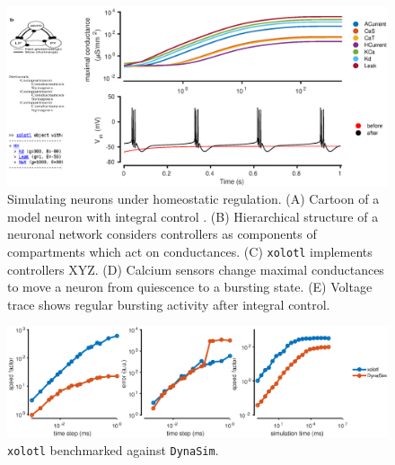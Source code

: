 \documentclass{frontiersSCNS} %
\begin{document}
\begin{figure}
	\centering
	\includegraphics[width=1.0\linewidth]{gfx/figure_integral_control}
	\caption{Simulating neurons under homeostatic regulation. (A) Cartoon of a model neuron \autocite{liuModelNeuronActivitydependent1998} with integral control \autocite{olearyCorrelationsIonChannel2013}. (B) Hierarchical structure of a neuronal network considers controllers as components of compartments which act on conductances. (C) \texttt{xolotl} implements controllers XYZ. (D) Calcium sensors change maximal conductances to move a neuron from quiescence to a bursting state. (E) Voltage trace shows regular bursting activity after integral control.}
	\label{fig:figureintegralcontrol}
\end{figure}

\begin{figure}
	\centering
	\includegraphics[width=1.0\linewidth]{gfx/figure_benchmark}
	\caption{\texttt{xolotl} benchmarked against \texttt{DynaSim}.}
	\label{fig:figurebenchmark}
\end{figure}
\end{document}

